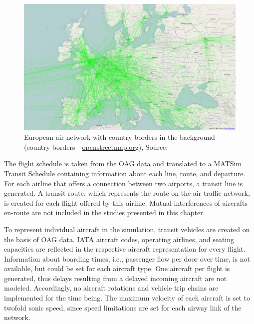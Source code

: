 \begin{figure}[t]
\begin{center}
  \includegraphics[width=\linewidth]{extending/figures/air/air_network_europe_osm.png}
\end{center}
\caption[European air network]{European air network with country borders in the background (country borders~\textcopyright~\url{openstreetmap.org}), Source:~\citet{Grether2014PhD}}
  \label{fig:matsim_air_network_eu}
\end{figure}

The flight schedule is taken from the OAG data and translated to a MATSim Transit Schedule containing information about each line, route, and departure. 
For each airline that offers a connection between two airports, a transit line is generated. 
A transit route, which represents the route on the air traffic network, is created for each flight offered by this airline. 
Mutual interferences of aircrafts en-route are not included in the studies presented in this chapter.


To represent individual aircraft in the simulation, transit vehicles are created on the basis of OAG data. 
IATA aircraft codes, operating airlines, and seating capacities are reflected in the respective aircraft representation for every flight. 
Information about boarding times, i.e., passenger flow per door over time, is not available, but could be set for each aircraft type. 
One aircraft per flight is generated, thus delays resulting from a delayed incoming aircraft are not modeled.
Accordingly, no aircraft rotations and vehicle trip chains are implemented for the time being. 
The maximum velocity of each aircraft is set to twofold sonic speed, since speed limitations are set for each airway link of the network. 


